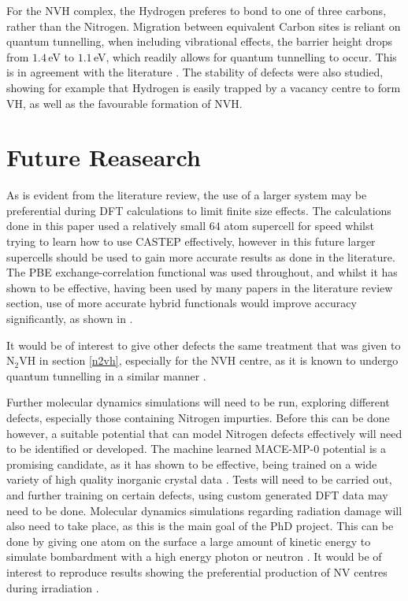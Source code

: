 \documentclass[10pt,a4paper,twocolumn,twoside]{extarticle}
\newcommand{\ntvh}{N$_2$VH}
\begin{document}
For the NVH complex, the Hydrogen preferes to bond to one of three carbons, rather than the Nitrogen. Migration between equivalent Carbon sites is reliant on quantum tunnelling, when including vibrational effects, the barrier height drops from $1.4$\,eV to $1.1$\,eV, which readily allows for quantum tunnelling to occur. This is in agreement with the literature \cite{Shaw_QT_VH}.
The stability of defects were also studied, showing for example that Hydrogen is easily trapped by a vacancy centre to form VH, as well as the favourable formation of NVH. 

\section{Future Reasearch}
\label{sec:future}
As is evident from the literature review, the use of a larger system may be preferential during DFT calculations to limit finite size effects. The calculations done in this paper used a relatively small $64$ atom supercell for speed whilst trying to learn how to use CASTEP effectively, however in this future larger supercells should be used to gain more accurate results as done in the literature.
The PBE exchange-correlation functional was used throughout, and whilst it has shown to be effective, having been used by many papers in the literature review section, use of more accurate hybrid functionals would improve accuracy significantly, as shown in \cite{Deak}. 

It would be of interest to give other defects the same treatment that was given to {\ntvh} in section \ref{n2vh}, especially for the NVH centre, as it is known to undergo quantum tunnelling in a similar manner \cite{Peaker,Shaw_QT_VH}.  

Further molecular dynamics simulations will need to be run, exploring different defects, especially those containing Nitrogen impurties. Before this can be done however, a suitable potential that can model Nitrogen defects effectively will need to be identified or developed. The machine learned MACE-MP-0 potential is a promising candidate, as it has shown to be effective, being trained on a wide variety of high quality inorganic crystal data \cite{MACE}. Tests will need to be carried out, and further training on certain defects, using custom generated DFT data may need to be done. Molecular dynamics simulations regarding radiation damage will also need to take place, as this is the main goal of the PhD project. This can be done by giving one atom on the surface a large amount of kinetic energy to simulate bombardment with a high energy photon or neutron \cite{radiation}. It would be of interest to reproduce results showing the preferential production of NV centres during irradiation \cite{Deak}. %

\printbibliography
\end{document}
